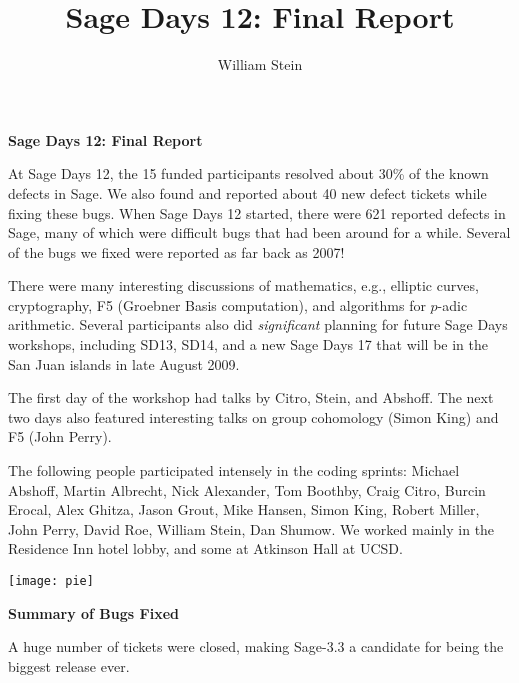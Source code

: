\documentclass{article}
\title{Sage Days 12: Final Report}
\author{William Stein}
\newcommand{\hd}[1]{\vspace{4ex}\noindent{\bf\large #1}\vspace{1ex}

\noindent}
\begin{document}
\begin{center}
{\LARGE\bf
Sage Days 12: Final Report}
\end{center}
\vspace{4ex} 

At Sage Days 12, the 15 funded participants resolved about 30\% of the
known defects in Sage.  We also found and reported about 40 new defect
tickets while fixing these bugs.  When Sage Days 12 started, there
were 621 reported defects in Sage, many of which were difficult bugs
that had been around for a while.  Several of the bugs we fixed were
reported as far back as 2007!

There were many interesting discussions of mathematics, e.g., elliptic
curves, cryptography, F5 (Groebner Basis computation), and algorithms
for $p$-adic arithmetic.  Several participants also did {\em
  significant} planning for future Sage Days workshops, including
SD13, SD14, and a new Sage Days 17 that will be in the San Juan
islands in late August 2009.


The first day of the workshop had talks by Citro, Stein, and Abshoff.
The next two days also featured interesting talks on group cohomology
(Simon King) and F5 (John Perry).  

The following people participated intensely in the coding sprints:
Michael Abshoff, Martin Albrecht, Nick Alexander, Tom Boothby, Craig
Citro, Burcin Erocal, Alex Ghitza, Jason Grout, Mike Hansen, Simon
King, Robert Miller, John Perry, David Roe, William Stein, Dan Shumow.
We worked mainly in the Residence Inn hotel lobby, and some at
Atkinson Hall at UCSD.



\begin{center}
\texttt{[image: pie]}
\end{center}

\newpage
\begin{center}
{\LARGE\bf
Summary of Bugs Fixed}
\end{center}
\vspace{4ex}

\hd{Overall}%

A huge number of tickets were closed, making Sage-3.3 a candidate for
being the biggest release ever.
\end{document}
